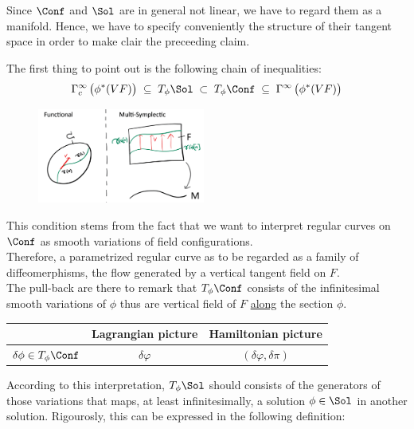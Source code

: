 \documentclass[a4paper,12pt,fleqn]{scrartcl}  %
\begin{document}
Since $\Conf$ and $\Sol$ are in general not linear, we have to regard them as a manifold.
Hence, we have to specify conveniently the structure of their tangent space in order to make clair the preceeding claim.

The first thing to point out is the following chain of inequalities:
\begin{equation}
	\Gamma^\infty_c\left(\phi^*(VF)\right) \; \subseteq \; T_\phi\Sol \; \subset \; T_\phi\Conf \; \subseteq \; \Gamma^\infty\left( \phi^\ast (VF) \right)
\end{equation}

\begin{figure}
\centering
\includegraphics[width=0.49\textwidth]{Pictures/variations.png}
\end{figure}

This condition stems from the fact that we want to interpret regular curves on $\Conf$ as smooth variations of field configurations. \\
Therefore, a parametrized regular curve as to be regarded as a family of diffeomerphisms, the flow generated by a vertical tangent field on $F$.\\
The pull-back are there to remark that $T_\phi \Conf$ consists of the infinitesimal smooth variations of $\phi$ thus are vertical field of $F$ \underline{along} the section $\phi$.
\begin{notation}
	\begin{center}
		\begin{tabular}{|c|c|c|}
			\hline
			 & Lagrangian picture & Hamiltonian picture \\
			\hline
			$\delta \phi \in T_\phi \Conf$		&	$\delta \varphi$		&	$(\delta \varphi, \delta \pi)$ \\
			\hline
		\end{tabular}
	\end{center}
\end{notation}

According to this interpretation, $T_\phi\Sol$ should consists of the generators of those variations that maps, at least infinitesimally, a solution $\phi\in\Sol$ in another solution.
Rigourosly, this can be expressed in the following definition:
\end{document}
